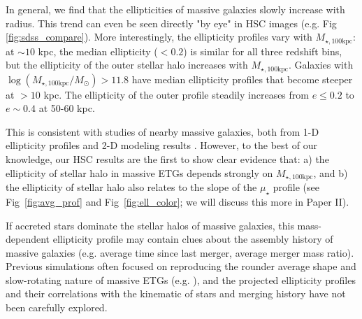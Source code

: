 \documentclass[a4paper,fleqn,usenatbib]{mnras}
\def\mtot{{$M_{\star,100\mathrm{kpc}}$}}
\def\logmtot{{$\log (M_{\star,100\mathrm{kpc}}/M_{\odot})$}}
\def\mden{{$\mu_{\star}$}}
\begin{document}
	In general, we find that the ellipticities of massive galaxies slowly increase 
	with radius. 
	This trend can even be seen directly "by eye" in HSC images (e.g. 
	Fig \ref{fig:sdss_compare}). 
	More interestingly, the ellipticity profiles vary with \mtot{}: 
	at ${\sim} 10$ kpc, the median ellipticity ($< 0.2$) is similar for all three 
	redshift bins, but the ellipticity of the outer stellar halo increases with 
	\mtot{}. 
	Galaxies with \logmtot{}$>11.8$ have median ellipticity profiles that become 
	steeper at $>10$ kpc. 
	The ellipticity of the outer profile steadily increases from 
	$e\le 0.2$ to $e{\sim} 0.4$ at 50-60 kpc.
    
	This is consistent with studies of nearby massive galaxies, both from 1-D 
	ellipticity profiles and 2-D modeling results \citep{Porter1991, Gonzalez2005, 
	Zibetti2005, Spavone2017, Huang2013a, Oh2017}. 
	However, to the best of our knowledge, our HSC results are the first to show 
	clear evidence that:  
	a) the ellipticity of stellar halo in massive ETGs depends strongly on 
	\mtot{}, and 
	b) the ellipticity of stellar halo also relates to the slope of the \mden{}
	profile (see Fig~\ref{fig:avg_prof} and Fig~\ref{fig:ell_color}; 
	we will discuss this more in Paper II). 
    
	If accreted stars dominate the stellar halos of massive galaxies, this 
	mass-dependent ellipticity profile may contain clues about the assembly history 
	of massive galaxies (e.g. average time since last merger, average merger 
	mass ratio).
	Previous simulations often focused on reproducing the rounder average shape 
	and slow-rotating nature of massive ETGs (e.g. \citealt{Wu2014}), and the 
	projected ellipticity profiles and their correlations with the kinematic of 
	stars and merging history have not been carefully explored. 
   
\end{document}
